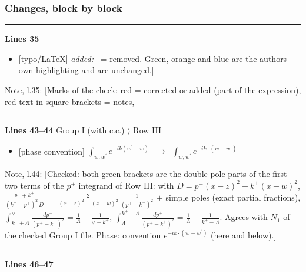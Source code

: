 \documentclass[10pt]{article}
\newenvironment{notebox}{\def\FrameCommand{{\color{notebar}\vrule width 1.5pt}\hspace{6pt}}\MakeFramed{\advance\hsize-\width\FrameRestore}\small}{\endMakeFramed}
\begin{document}
\subsubsection*{Changes, block by block}
\noindent\rule{\linewidth}{0.3pt}\par\noindent\textbf{Lines 35}\par
\begin{itemize}[leftmargin=2.2em,itemsep=1pt,topsep=2pt]
\item[\textbf{l.35}] \textsf{\small [typo/LaTeX]} \emph{added:} \ = removed. Green, orange and blue are the author\textquotesingle s own highlighting and are unchanged.]
\end{itemize}
\begin{notebox}\textsf{\small Note, l.35:} [Marks of the check: red = corrected or added (part of the expression), red text in square brackets = notes,\end{notebox}
\noindent\rule{\linewidth}{0.3pt}\par\noindent\textbf{Lines 43--44} \quad \textsf{Group I (with c.c.) $\rangle$ Row III} \par
\begin{itemize}[leftmargin=2.2em,itemsep=1pt,topsep=2pt]
\item[\textbf{l.43}] \textsf{\small [phase convention]} $\displaystyle \int_{w, w^\prime} e^{-ik(w^\prime-w)}\,$\ $\longrightarrow$\ $\displaystyle \int_{w, w^\prime} e^{-ik\cdot(w-w^\prime)}\,$
\end{itemize}
\begin{notebox}\textsf{\small Note, l.44:} [Checked: both green brackets are the double-pole parts of the first two terms of the $p^{+}$ integrand of Row III: with $D=p^{+}(x-z)^{2}-k^{+}(x-w)^{2}$, $\frac{p^{+}+k^{+}}{(k^{+}-p^{+})^{2}\,D}$ $=\frac{2}{(x-z)^{2}-(x-w)^{2}}\,\frac{1}{(p^{+}-k^{+})^{2}}$ $+$ simple poles (exact partial fractions), $\int_{k^{+}+\Lambda}^{\vee}\frac{dp^{+}}{(p^{+}-k^{+})^{2}}=\frac{1}{\Lambda}-\frac{1}{\vee-k^{+}}$, $\int_{\Lambda}^{k^{+}-\Lambda}\frac{dp^{+}}{(p^{+}-k^{+})^{2}}=\frac{1}{\Lambda}-\frac{1}{k^{+}-\Lambda}$. Agrees with $N_{1}$ of the checked Group I file. Phase: convention $e^{-ik\cdot(w-w^\prime)}$ (here and below).]\end{notebox}
\noindent\rule{\linewidth}{0.3pt}\par\noindent\textbf{Lines 46--47} \par
\end{document}
